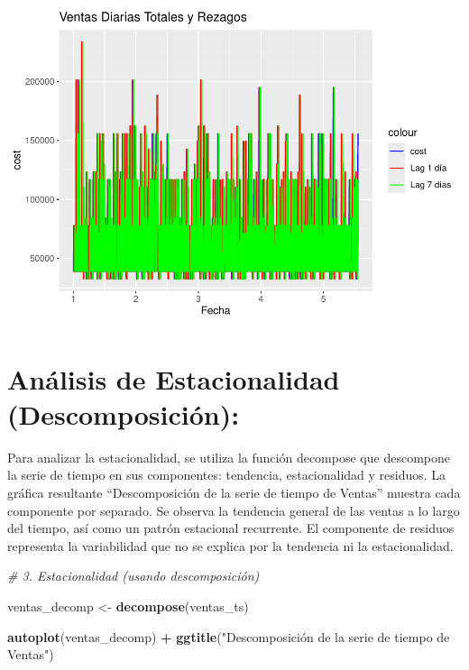 \documentclass[
]{book}
\newenvironment{Shaded}{\begin{snugshade}}{\end{snugshade}}
\newcommand{\CommentTok}[1]{\textcolor[rgb]{0.56,0.35,0.01}{\textit{#1}}}
\newcommand{\FunctionTok}[1]{\textcolor[rgb]{0.13,0.29,0.53}{\textbf{#1}}}
\newcommand{\NormalTok}[1]{#1}
\newcommand{\OtherTok}[1]{\textcolor[rgb]{0.56,0.35,0.01}{#1}}
\newcommand{\SpecialCharTok}[1]{\textcolor[rgb]{0.81,0.36,0.00}{\textbf{#1}}}
\newcommand{\StringTok}[1]{\textcolor[rgb]{0.31,0.60,0.02}{#1}}
\begin{document}
\includegraphics{_main_files/figure-latex/unnamed-chunk-8-1.pdf}

\section{Análisis de Estacionalidad (Descomposición):}\label{anuxe1lisis-de-estacionalidad-descomposiciuxf3n}

Para analizar la estacionalidad, se utiliza la función decompose que descompone la serie de tiempo en sus componentes: tendencia, estacionalidad y residuos. La gráfica resultante ``Descomposición de la serie de tiempo de Ventas'' muestra cada componente por separado. Se observa la tendencia general de las ventas a lo largo del tiempo, así como un patrón estacional recurrente. El componente de residuos representa la variabilidad que no se explica por la tendencia ni la estacionalidad.

\begin{Shaded}
\begin{Highlighting}[]
\CommentTok{\# 3. Estacionalidad (usando descomposición)}

\NormalTok{ventas\_decomp }\OtherTok{\textless{}{-}} \FunctionTok{decompose}\NormalTok{(ventas\_ts)}

\FunctionTok{autoplot}\NormalTok{(ventas\_decomp) }\SpecialCharTok{+} \FunctionTok{ggtitle}\NormalTok{(}\StringTok{"Descomposición de la serie de tiempo de Ventas"}\NormalTok{)}
\end{Highlighting}
\end{Shaded}
\end{document}
